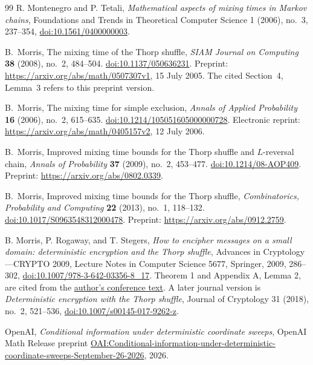 \begin{thebibliography}{99}
R. Montenegro and P. Tetali,
\emph{Mathematical aspects of mixing times in Markov chains},
Foundations and Trends in Theoretical Computer Science 1 (2006), no.~3,
237--354, \href{https://doi.org/10.1561/0400000003}{doi:10.1561/0400000003}.

B.~Morris,
The mixing time of the Thorp shuffle,
\emph{SIAM Journal on Computing} \textbf{38} (2008), no.~2, 484--504.
\href{https://doi.org/10.1137/050636231}{doi:10.1137/050636231}.
Preprint: \url{https://arxiv.org/abs/math/0507307v1}, 15 July 2005.
The cited Section~4, Lemma~3 refers to this preprint version.

B.~Morris,
The mixing time for simple exclusion,
\emph{Annals of Applied Probability} \textbf{16} (2006), no.~2, 615--635.
\href{https://doi.org/10.1214/105051605000000728}
{doi:10.1214/105051605000000728}.
Electronic reprint: \url{https://arxiv.org/abs/math/0405157v2},
12 July 2006.

B.~Morris,
Improved mixing time bounds for the Thorp shuffle and $L$-reversal chain,
\emph{Annals of Probability} \textbf{37} (2009), no.~2, 453--477.
\href{https://doi.org/10.1214/08-AOP409}{doi:10.1214/08-AOP409}.
Preprint: \url{https://arxiv.org/abs/0802.0339}.

B.~Morris,
Improved mixing time bounds for the Thorp shuffle,
\emph{Combinatorics, Probability and Computing} \textbf{22} (2013),
no.~1, 118--132.
\href{https://doi.org/10.1017/S0963548312000478}
{doi:10.1017/S0963548312000478}.
Preprint: \url{https://arxiv.org/abs/0912.2759}.

B. Morris, P. Rogaway, and T. Stegers,
\emph{How to encipher messages on a small domain:
deterministic encryption and the Thorp shuffle},
Advances in Cryptology---CRYPTO 2009,
Lecture Notes in Computer Science 5677, Springer, 2009, 286--302,
\href{https://doi.org/10.1007/978-3-642-03356-8_17}{doi:10.1007/978-3-642-03356-8\_17}.
Theorem 1 and Appendix A, Lemma 2, are cited from the
\href{https://www.cs.ucdavis.edu/~rogaway/papers/thorp.pdf}{author's conference text}.
A later journal version is \emph{Deterministic encryption with the Thorp shuffle},
Journal of Cryptology 31 (2018), no.~2, 521--536,
\href{https://doi.org/10.1007/s00145-017-9262-z}{doi:10.1007/s00145-017-9262-z}.

OpenAI,
\emph{Conditional information under deterministic coordinate sweeps},
OpenAI Math Release preprint
\href{https://github.com/openai/math/blob/main/preprints/Conditional-information-under-deterministic-coordinate-sweeps-September-26-2026/main.pdf}{OAI:Conditional-information-under-deterministic-coordinate-sweeps-September-26-2026},
2026.


\end{thebibliography}
